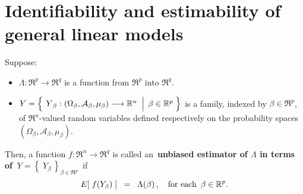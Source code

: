 

\section{Identifiability and estimability of general linear models}
\setcounter{theorem}{0}
\setcounter{equation}{0}

\renewcommand{\theenumi}{\roman{enumi}}
\renewcommand{\labelenumi}{\textnormal{(\theenumi)}$\;\;$}


\begin{definition}
\mbox{}\vskip 0.1cm\noindent
Suppose:
\begin{itemize}
\item
	$\Lambda : \Re^{p} \longrightarrow \Re^{q}$ is a function from $\Re^{p}$ into $\Re^{q}$.
\item
	$Y = \left\{\;
		\left.
		\overset{{\color{white}.}}{Y}_{\beta} : (\Omega_{\beta},\mathcal{A}_{\beta},\mu_{\beta}) \longrightarrow \Re^{n}
		\;\;\right\vert\;
		\beta \in \Re^{p}
		\;\right\}$
	is a family, indexed by $\beta \in \Re^{p}$,
	of $\Re^{n}$-valued random variables defined respectively on the
	probability spaces $(\Omega_{\beta},\mathcal{A}_{\beta},\mu_{\beta})$.
\end{itemize}
Then,
a function $f : \Re^{n} \longrightarrow \Re^{q}$ is called an
\,{\color{red}\textbf{unbiased estimator of $\Lambda$ in terms of \,$Y = \left\{\;Y_{\beta}\,\right\}_{\beta\in\Re^{p}}$}}\,
if
\begin{equation*}
E\!\left[\;f(Y_{\beta})\;\right] \;\; =\;\; \Lambda(\beta)\,,
\quad
\textnormal{for each \,$\beta \in \Re^{p}$}.
\end{equation*}
\end{definition}

